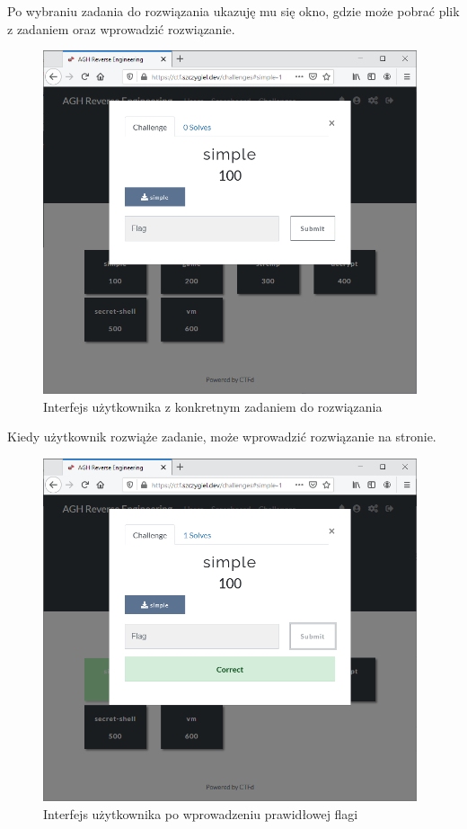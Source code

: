 \documentclass[polish,12pt]{aghthesis}
\begin{document}
Po wybraniu zadania do rozwiązania ukazuję mu się okno, gdzie może pobrać plik z zadaniem oraz wprowadzić
rozwiązanie.
\begin{figure}[H]
    \centering
    \includegraphics[width=11cm]{ui_download}
    \caption{Interfejs użytkownika z konkretnym zadaniem do rozwiązania}
    \label{fig:ui_download}
\end{figure}

Kiedy użytkownik rozwiąże zadanie, może wprowadzić rozwiązanie na stronie.

\begin{figure}[H]
    \centering
    \includegraphics[width=11cm]{ui_solved}
    \caption{Interfejs użytkownika po wprowadzeniu prawidłowej flagi}
    \label{fig:ui_solved}
\end{figure}
\clearpage
\end{document}

